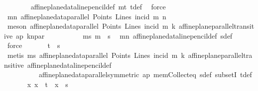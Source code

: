 \begin{isabellebody}
\ \ \ \ \ \ \isamarkupfalse%
\ affine{\isacharunderscore}{\kern0pt}plane{\isacharunderscore}{\kern0pt}data{\isachardot}{\kern0pt}line{\isacharunderscore}{\kern0pt}pencil{\isacharunderscore}{\kern0pt}def\ mt\ tdef\ \isamarkupfalse%
\ force\ \isanewline
\ \ \ \ \isamarkupfalse%
\ mn{\isacharcolon}{\kern0pt}\ {\isachardoublequoteopen}affine{\isacharunderscore}{\kern0pt}plane{\isacharunderscore}{\kern0pt}data{\isachardot}{\kern0pt}parallel\ Points\ Lines\ {\isacharparenleft}{\kern0pt}incid{\isacharparenright}{\kern0pt}\ m\ n{\isachardoublequoteclose}\isanewline
\ \ \ \ \isamarkupfalse%
\ {\isacharparenleft}{\kern0pt}meson\ {\isacartoucheopen}affine{\isacharunderscore}{\kern0pt}plane{\isacharunderscore}{\kern0pt}data{\isachardot}{\kern0pt}parallel\ Points\ Lines\ incid\ m\ k{\isacartoucheclose}\ affine{\isacharunderscore}{\kern0pt}plane{\isachardot}{\kern0pt}parallel{\isacharunderscore}{\kern0pt}transitive{}\ ap\ kn{\isacharunderscore}{\kern0pt}par{\isacharparenright}{\kern0pt}\isanewline
\ \ \ \ \isanewline
\ \ \ \ \isamarkupfalse%
\ ms{\isacharcolon}{\kern0pt}\ {\isachardoublequoteopen}m\ {\isasymin}\ s{\isachardoublequoteclose}\ \isamarkupfalse%
\ mn\ affine{\isacharunderscore}{\kern0pt}plane{\isacharunderscore}{\kern0pt}data{\isachardot}{\kern0pt}line{\isacharunderscore}{\kern0pt}pencil{\isacharunderscore}{\kern0pt}def\ sdef\ \isamarkupfalse%
\ force\isanewline
\ \ \ \ \isamarkupfalse%
\ \ {\isachardoublequoteopen}t\ {\isasymsubseteq}\ s{\isachardoublequoteclose}\ \isanewline
\ \ \ \ \ \ \isamarkupfalse%
\ {\isacharparenleft}{\kern0pt}metis\ ms\ {\isacartoucheopen}affine{\isacharunderscore}{\kern0pt}plane{\isacharunderscore}{\kern0pt}data{\isachardot}{\kern0pt}parallel\ Points\ Lines\ incid\ m\ k{\isacartoucheclose}\ affine{\isacharunderscore}{\kern0pt}plane{\isachardot}{\kern0pt}parallel{\isacharunderscore}{\kern0pt}transitive{}\ affine{\isacharunderscore}{\kern0pt}plane{\isacharunderscore}{\kern0pt}data{\isachardot}{\kern0pt}line{\isacharunderscore}{\kern0pt}pencil{\isacharunderscore}{\kern0pt}def\isanewline
\ \ \ \ \ \ \ \ \ \ affine{\isacharunderscore}{\kern0pt}plane{\isacharunderscore}{\kern0pt}data{\isachardot}{\kern0pt}parallel{\isacharunderscore}{\kern0pt}symmetric\ ap\ mem{\isacharunderscore}{\kern0pt}Collect{\isacharunderscore}{\kern0pt}eq\ sdef\ subsetI\ tdef{\isacharparenright}{\kern0pt}\isanewline
\ \ \ \ \isamarkupfalse%
\ {\isachardoublequoteopen}\ {\isasymAnd}x{\isachardot}{\kern0pt}\ x\ {\isasymin}\ t\ {\isasymLongrightarrow}\ x\ {\isasymin}\ s{\isachardoublequoteclose}\ \isamarkupfalse%

\end{isabellebody}
